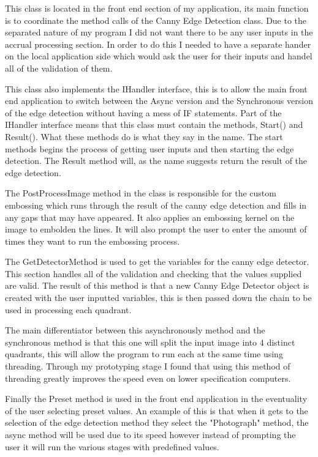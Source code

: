 \begin{FlushLeft}
    This class is located in the front end section of my application, its main function is to coordinate the method calls of the Canny Edge Detection class. Due to the separated nature of my program I did not want there to be any user inputs in the accrual processing section. In order to do this I needed to have a separate hander on the local application side which would ask the user for their inputs and handel all of the validation of them. \\ \bk

    This class also implements the IHandler interface, this is to allow the main front end application to switch between the Async version and the Synchronous version of the edge detection without having a mess of IF statements. Part of the IHandler interface means that this class must contain the methods, Start() and Result(). What these methods do is what they say in the name. The start methods begins the process of getting user inputs and then starting the edge detection. The Result method will, as the name suggests return the result of the edge detection. \\ \bk

    The PostProcessImage method in the class is responsible for the custom embossing which runs through the result of the canny edge detection and fills in any gaps that may have appeared. It also applies an embossing kernel on the image to embolden the lines. It will also prompt the user to enter the amount of times they want to run the embossing process. \\ \bk
    
    The GetDetectorMethod is used to get the variables for the canny edge detector. This section handles all of the validation and checking that the values supplied are valid. The result of this method is that a new Canny Edge Detector object is created with the user inputted variables, this is then passed down the chain to be used in processing each quadrant. \\ \bk

    The main differentiator between this asynchronously method and the synchronous method is that this one will split the input image into 4 distinct quadrants, this will allow the program to run each at the same time using threading. Through my prototyping stage I found that using this method of threading greatly improves the speed even on lower specification computers. \\ \bk
    
    Finally the Preset method is used in the front end application in the eventuality of the user selecting preset values. An example of this is that when it gets to the selection of the edge detection method they select the "Photograph" method, the async method will be used due to its speed however instead of prompting the user it will run the various stages with predefined values. \\


\end{FlushLeft}
